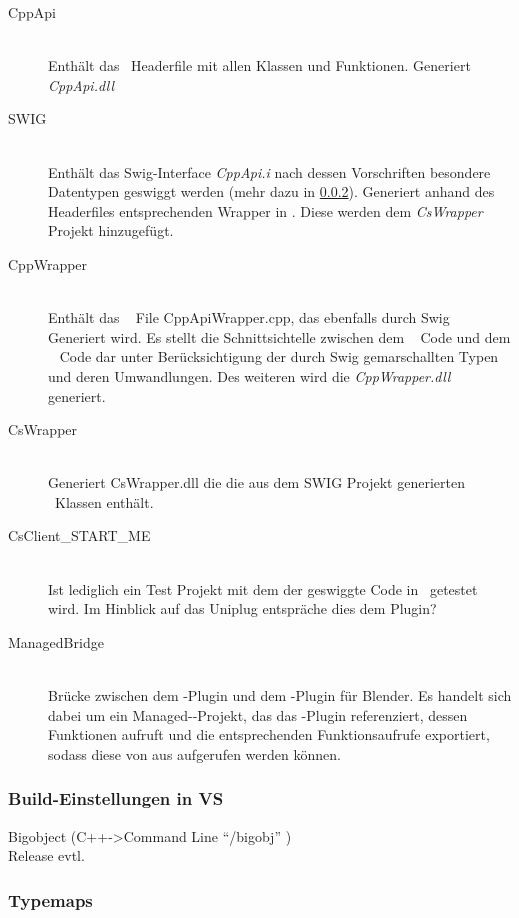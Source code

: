 \begin{description}
\item[CppApi]\hfill \\
Enthält das \CC~Headerfile mit allen Klassen und Funktionen. Generiert \emph{CppApi.dll}
\item[SWIG]\hfill \\
Enthält das Swig-Interface \emph{CppApi.i} nach dessen Vorschriften besondere Datentypen geswiggt werden (mehr dazu in \ref{subsubsec:Typemaps}). Generiert anhand des Headerfiles entsprechenden Wrapper in \CS. Diese werden dem \emph{CsWrapper} Projekt hinzugefügt.
\item[CppWrapper]\hfill \\
Enthält das \CC~ File CppApiWrapper.cpp, das ebenfalls durch Swig Generiert wird. Es stellt die Schnittsichtelle zwischen dem \CC~ Code und dem \CS~ Code dar unter Berücksichtigung der durch Swig gemarschallten Typen und deren Umwandlungen. Des weiteren wird die \emph{CppWrapper.dll} generiert. 
\item[CsWrapper]\hfill \\
Generiert CsWrapper.dll die die aus dem SWIG Projekt generierten \CS~Klassen enthält. 
\item[CsClient\_START\_ME]\hfill \\
Ist lediglich ein Test Projekt mit dem der geswiggte Code in \CS~getestet wird. Im Hinblick auf das Uniplug entspräche dies dem Plugin?
\item[ManagedBridge]\hfill \\ Brücke zwischen dem \CS-Plugin und dem \CC-Plugin für Blender. Es handelt sich dabei um ein Managed-\CC-Projekt, das das \CS{}-Plugin referenziert, dessen Funktionen aufruft und die entsprechenden Funktionsaufrufe exportiert, sodass diese von \CC aus aufgerufen werden können.
\end{description}

  

\subsubsection{Build-Einstellungen in VS}\label{subsubsec:Build}
	Bigobject (C++->Command Line "`/bigobj"' )\\
	Release evtl.


\subsubsection{Typemaps}\label{subsubsec:Typemaps}

